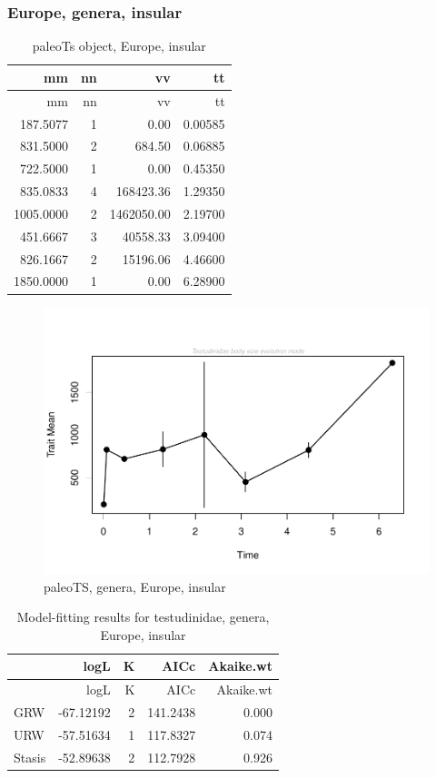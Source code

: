 \FloatBarrier



\subsubsection{Europe, genera,
	insular}\label{europe-genera-insular}

\begin{longtable}[]{@{}rrrr@{}}
	\caption{paleoTs object, Europe, insular}
	\label{tab:pTSEuI}\tabularnewline
	\toprule
	mm & nn & vv & tt\tabularnewline
	\midrule
	\endfirsthead
	\toprule
	mm & nn & vv & tt\tabularnewline
	\midrule
	\endhead
	187.5077 & 1 & 0.00 & 0.00585\tabularnewline
	831.5000 & 2 & 684.50 & 0.06885\tabularnewline
	722.5000 & 1 & 0.00 & 0.45350\tabularnewline
	835.0833 & 4 & 168423.36 & 1.29350\tabularnewline
	1005.0000 & 2 & 1462050.00 & 2.19700\tabularnewline
	451.6667 & 3 & 40558.33 & 3.09400\tabularnewline
	826.1667 & 2 & 15196.06 & 4.46600\tabularnewline
	1850.0000 & 1 & 0.00 & 6.28900\tabularnewline
	\bottomrule
\end{longtable}

\begin{figure}[H]
	\centering
	\includegraphics{MA_JJ_files/figure-latex/pTSEuI-1.pdf}
	\caption{paleoTS, genera, Europe, insular}
	\label{fig:pTSEuI}
\end{figure}

\begin{longtable}[]{@{}lrrrr@{}}
	\caption{Model-fitting results for testudinidae, genera, Europe,
		insular}
	\label{tab:pTSEuIEM}\tabularnewline
	\toprule
	& logL & K & AICc & Akaike.wt\tabularnewline
	\midrule
	\endfirsthead
	\toprule
	& logL & K & AICc & Akaike.wt\tabularnewline
	\midrule
	\endhead
	GRW & -67.12192 & 2 & 141.2438 & 0.000\tabularnewline
	URW & -57.51634 & 1 & 117.8327 & 0.074\tabularnewline
	Stasis & -52.89638 & 2 & 112.7928 & 0.926\tabularnewline
	\bottomrule
\end{longtable}

